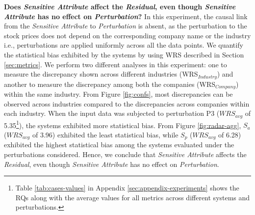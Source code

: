 

{\color{blue}} \textbf{Does \emph{Sensitive Attribute} affect the \emph{Residual}, even though \emph{Sensitive Attribute} has no effect on \emph{Perturbation}?}
In this experiment, the causal link from the \emph{Sensitive Attribute} to \emph{Perturbation} is absent, as the perturbation to the stock prices does not depend on the corresponding company name or the industry i.e., perturbations are applied uniformly across all the data points. 
We quantify the statistical bias exhibited by the systems by using WRS described in Section \ref{sec:metrics}. 
We perform two different analyses in this experiment: one to measure the discrepancy shown across different industries (WRS$_{Industry}$) and another to measure the discrepancy among both the companies (WRS$_{Company}$) within the same industry.  
  From Figure \ref{fig:confs},  most discrepancies can be observed across industries compared to the discrepancies across companies within each industry. When the input data was subjected to perturbation P3 ($WRS_{avg}$ of 5.35\footnote{Table \ref{tab:cases-values} in Appendix \ref{sec:appendix-experiments} shows the RQs along with the average values for all metrics across different systems and perturbations.}), the systems exhibited more statistical bias. From Figure \ref{fig:radar-agg}, $S_a$ ($WRS_{avg}$ of 3.96) exhibited the least statistical bias, while $S_p$ ($WRS_{avg}$ of 6.28) exhibited the highest statistical bias among the systems evaluated under the perturbations considered. 
Hence, we conclude that \emph{Sensitive Attribute} affects the \emph{Residual}, even though \emph{Sensitive Attribute} has no effect on \emph{Perturbation}.


